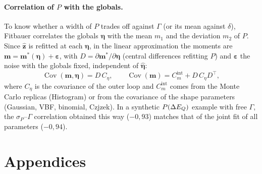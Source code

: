 \paragraph{Correlation of $P$ with the globals.} To know whether a width of $P$
trades off against $\Gamma$ (or its mean against $\delta$), Fitbauer correlates the
globals $\bm\eta$ with the mean $m_1$ and the deviation $m_2$ of $P$. Since
$\hat{\bm z}$ is refitted at each $\bm\eta$, in the linear approximation the moments
are $\bm m=\bm m^*(\bm\eta)+\bm\varepsilon$, with $D=\partial\bm m^*/\partial\bm\eta$
(central differences refitting $P$) and $\bm\varepsilon$ the noise with the globals
fixed, independent of $\hat{\bm\eta}$:
\begin{equation}
  \operatorname{Cov}(\bm m,\bm\eta)=D\,C_\eta,\qquad
  \operatorname{Cov}(\bm m)=C_m^{\text{int}}+D\,C_\eta D^\top,
\end{equation}
where $C_\eta$ is the covariance of the outer loop and $C_m^{\text{int}}$ comes from
the Monte Carlo replicas (Histogram) or from the covariance of the shape parameters
(Gaussian, VBF, binomial, Czjzek). In a synthetic $P(\Delta E_{Q})$ example with free
$\Gamma$, the $\sigma_P$--$\Gamma$ correlation obtained this way ($-0{,}93$) matches
that of the joint fit of all parameters ($-0{,}94$).


\section{Appendices}

